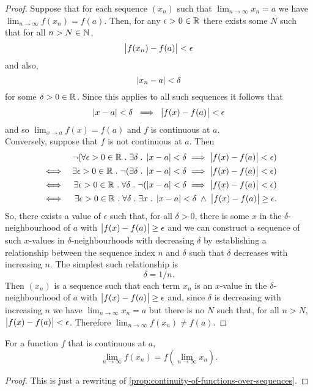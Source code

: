 \documentclass[../MathsNotesBase.tex]{subfiles}
\begin{document}
	\bigskip	
	\begin{proof}
		Suppose that for each sequence $(x_n)$ such that ${ \lim_{n \to \infty} x_n = a  }$ we have ${ \lim_{n \to \infty} f(x_n) = f(a) }$. Then, for any ${ \epsilon > 0 \in \mathbb{R}^{} }$ there exists some $N$ such that for all ${ n > N \in \mathbb{N}^{} }$,
		\[ \left\lvert f(x_n) - f(a)\right\rvert < \epsilon \]
		and also,
		\[ \left\lvert x_n - a\right\rvert < \delta \]
		for some ${ \delta > 0 \in \mathbb{R}^{} }$. Since this applies to all such sequences it follows that
		\[ \left\lvert x - a\right\rvert < \delta \; \implies \; \left\lvert f(x) - f(a)\right\rvert < \epsilon \]
		and so ${ \lim_{x \to a} f(x) = f(a) }$ and $f$ is continuous at $a$.\\
		
		Conversely, suppose that $f$ is not continuous at $a$. Then
		\[\begin{aligned}
			&& \lnot ( \forall \epsilon > 0 \in \mathbb{R}^{} \;.\; \exists \delta \;.\; \left\lvert x - a\right\rvert < \delta \implies \left\lvert f(x) - f(a)\right\rvert < \epsilon ) \\
			&\iff & \exists \epsilon > 0 \in \mathbb{R}^{} \;.\; \lnot ( \exists \delta \;.\; \left\lvert x - a\right\rvert < \delta \implies \left\lvert f(x) - f(a)\right\rvert < \epsilon ) \\
			&\iff & \exists \epsilon > 0 \in \mathbb{R}^{} \;.\; \forall \delta \;.\; \lnot ( \left\lvert x - a\right\rvert < \delta \implies \left\lvert f(x) - f(a)\right\rvert < \epsilon ) \\
			&\iff & \exists \epsilon > 0 \in \mathbb{R}^{} \;.\; \forall \delta \;.\; \exists x \;.\; \left\lvert x - a\right\rvert < \delta \; \land \; \left\lvert f(x) - f(a)\right\rvert \geq \epsilon.
		\end{aligned}\]
		So, there exists a value of $\epsilon$ such that, for all ${ \delta > 0 }$, there is some $x$ in the $\delta$-neighbourhood of $a$ with ${ \left\lvert f(x) - f(a)\right\rvert \geq \epsilon }$ and we can construct a sequence of such $x$-values in $\delta$-neighbourhoods with decreasing $\delta$ by establishing a relationship between the sequence index $n$ and $\delta$ such that $\delta$ decreases with increasing $n$. The simplest such relationship is
		\[ \delta = 1/n. \]
		Then $(x_n)$ is a sequence such that each term $x_n$ is an $x$-value in the $\delta$-neighbourhood of $a$ with ${ \left\lvert f(x) - f(a)\right\rvert \geq \epsilon }$ and, since $\delta$ is decreasing with increasing $n$ we have ${ \lim_{n \to \infty} x_n = a }$ but there is no $N$ such that, for all ${ n > N }$, ${ \left\lvert f(x) - f(a)\right\rvert < \epsilon }$. Therefore ${ \lim_{n \to \infty} f(x_n) \neq f(a) }$.
	\end{proof}
	\smallskip
	\begin{corollary}\label{cor:lim_of_func_of_convergent_sequence_is_func_of_limit}
		For a function $f$ that is continuous at $a$, 
		\[ \lim_{n \to \infty} f(x_n) = f\left( \lim_{n \to \infty} x_n \right). \]
	\end{corollary}
	\begin{proof}
		This is just a rewriting of \autoref{prop:continuity-of-functions-over-sequences}.
	\end{proof}
\end{document}
